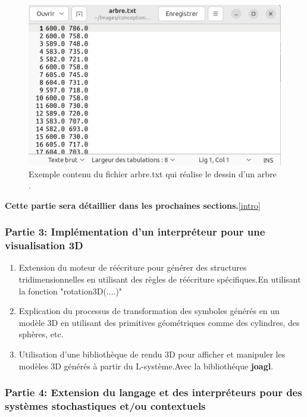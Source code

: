 \begin{enumerate}
    \begin{figure}[h]
    \centering
    \includegraphics[scale=0.3]{images/contenufichier.png}
    \caption{Exemple contenu du fichier arbre.txt qui réalise le dessin d'un arbre  . }
    \end{figure}

    \newpage
    \end{enumerate}
   
   
  \textbf{Cette partie sera détaillier dans les prochaines sections.}\ref{intro}

   

\subsubsection{Partie 3: Implémentation d'un interpréteur pour une visualisation 3D}

\begin{enumerate}
    \item Extension du moteur de réécriture pour générer des structures tridimensionnelles en utilisant des règles de réécriture spécifiques.En utilisant la fonction "rotation3D(....)"
    \item Explication du processus de transformation des symboles générés en un modèle 3D en utilisant des primitives géométriques comme des cylindres, des sphères, etc.
    \item Utilisation d'une bibliothèque de rendu 3D pour afficher et manipuler les modèles 3D générés à partir du L-système.Avec la bibliothéque \textbf{joagl}.
\end{enumerate}
    
\subsubsection{Partie 4: Extension du langage et des interpréteurs pour des systèmes stochastiques et/ou contextuels}

